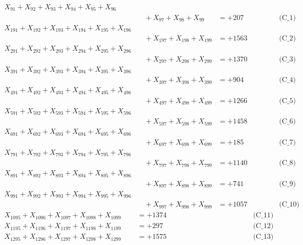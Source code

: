 \documentclass[a4paper,10pt]{article}
\begin{document}
\allowdisplaybreaks
{\small
\begin{align}
X_{91} + X_{92} + X_{93} + X_{94} + X_{95} + X_{96} \\[0.1ex]
&\quad  + X_{97} + X_{98} + X_{99} &= +207 && \text{(C\_1)} \\
X_{191} + X_{192} + X_{193} + X_{194} + X_{195} + X_{196} \\[0.1ex]
&\quad  + X_{197} + X_{198} + X_{199} &= +1563 && \text{(C\_2)} \\
X_{291} + X_{292} + X_{293} + X_{294} + X_{295} + X_{296} \\[0.1ex]
&\quad  + X_{297} + X_{298} + X_{299} &= +1370 && \text{(C\_3)} \\
X_{391} + X_{392} + X_{393} + X_{394} + X_{395} + X_{396} \\[0.1ex]
&\quad  + X_{397} + X_{398} + X_{399} &= +904 && \text{(C\_4)} \\
X_{491} + X_{492} + X_{493} + X_{494} + X_{495} + X_{496} \\[0.1ex]
&\quad  + X_{497} + X_{498} + X_{499} &= +1266 && \text{(C\_5)} \\
\allowbreak
X_{591} + X_{592} + X_{593} + X_{594} + X_{595} + X_{596} \\[0.1ex]
&\quad  + X_{597} + X_{598} + X_{599} &= +1458 && \text{(C\_6)} \\
X_{691} + X_{692} + X_{693} + X_{694} + X_{695} + X_{696} \\[0.1ex]
&\quad  + X_{697} + X_{698} + X_{699} &= +185 && \text{(C\_7)} \\
X_{791} + X_{792} + X_{793} + X_{794} + X_{795} + X_{796} \\[0.1ex]
&\quad  + X_{797} + X_{798} + X_{799} &= +1140 && \text{(C\_8)} \\
X_{891} + X_{892} + X_{893} + X_{894} + X_{895} + X_{896} \\[0.1ex]
&\quad  + X_{897} + X_{898} + X_{899} &= +741 && \text{(C\_9)} \\
X_{991} + X_{992} + X_{993} + X_{994} + X_{995} + X_{996} \\[0.1ex]
&\quad  + X_{997} + X_{998} + X_{999} &= +1057 && \text{(C\_10)} \\
\allowbreak
X_{1095} + X_{1096} + X_{1097} + X_{1098} + X_{1099} &= +1374 && \text{(C\_11)} \\
X_{1195} + X_{1196} + X_{1197} + X_{1198} + X_{1199} &= +297 && \text{(C\_12)} \\
X_{1295} + X_{1296} + X_{1297} + X_{1298} + X_{1299} &= +1575 && \text{(C\_13)} \\

\end{align}}
\end{document}

